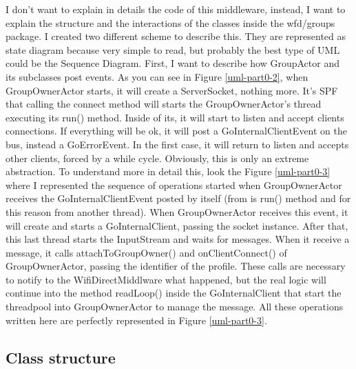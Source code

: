 I don't want to explain in details the code of this middleware, instead, I want to explain the structure and the interactions of the classes inside the wfd/groups package.
I created two different scheme to describe this. They are represented as state diagram because very simple to read, but probably the best type of UML could be the Sequence Diagram.
First, I want to describe how \textsf{GroupActor} and its subclasses post events. As you can see in Figure \ref{uml-part0-2}, when \textsf{GroupOwnerActor} starts, it will create a \textsf{ServerSocket}, nothing more. It's SPF that calling the connect method will starts the \textsf{GroupOwnerActor}'s thread executing its \textsf{run()} method. Inside of its, it will start to listen and accept clients connections. If everything will be ok, it will post a \textsf{GoInternalClientEvent} on the bus, instead a \textsf{GoErrorEvent}. In the first case, it will return to listen and accepts other clients, forced by a while cycle. Obviously, this is only an extreme abstraction. To understand more in detail this, look the Figure \ref{uml-part0-3} where I represented the sequence of operations started when \textsf{GroupOwnerActor} receives the \textsf{GoInternalClientEvent} posted by itself (from is \textsf{run()} method and for this reason from another thread).
When \textsf{GroupOwnerActor} receives this event, it will create and starts a \textsf{GoInternalClient}, passing the socket instance. After that, this last thread starts the InputStream and waits for messages. 
When it receive a message, it calls \textsf{attachToGroupOwner()} and \textsf{onClientConnect()} of \textsf{GroupOwnerActor}, passing the identifier of the profile. These calls are necessary to notify to the \textsf{WifiDirectMiddlware} what happened, but the real logic will continue into the method \textsf{readLoop()} inside the \textsf{GoInternalClient} that start the threadpool into \textsf{GroupOwnerActor} to manage the message. All these operations written here are perfectly represented in Figure \ref{uml-part0-3}.


\subsection{Class structure}

